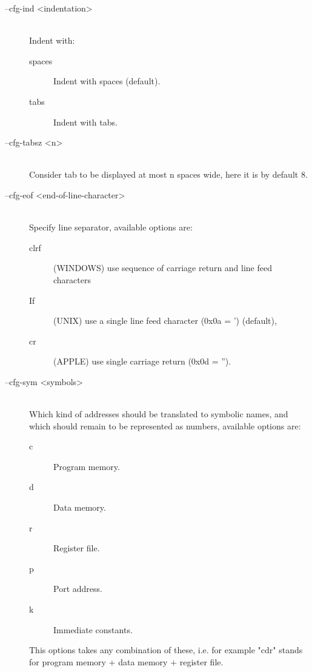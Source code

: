 \begin{description}
                \item[--cfg-ind <indentation>]~\\
                    Indent with:
                    \begin{description}
                        \item [spaces] Indent with spaces (default).
                        \item [tabs] Indent with tabs.
                    \end{description}

                \item[--cfg-tabsz <n>]~\\
                    Consider tab to be displayed at most n spaces wide, here it is by default 8.

                \item[--cfg-eof <end-of-line-character>]~\\
                    Specify line separator, available options are:
                    \begin{description}
                        \item [clrf] (WINDOWS) use sequence of carriage return and line feed characters
                        \item [If] (UNIX) use a single line feed character (0x0a = ') (default),
                        \item [cr] (APPLE) use single carriage return (0x0d = '').
                    \end{description}

                \item[--cfg-sym <symbols>]~\\
                    Which kind of addresses should be translated to symbolic names, and which should remain to be represented as numbers, available options are:
                    \begin{description}
                        \item [c] Program memory.
                        \item [d] Data memory.
                        \item [r] Register file.
                        \item [p] Port address.
                        \item [k] Immediate constants.
                    \end{description}
                    This options takes any combination of these, i.e. for example "cdr" stands for program memory + data memory + register file.


\end{description}
